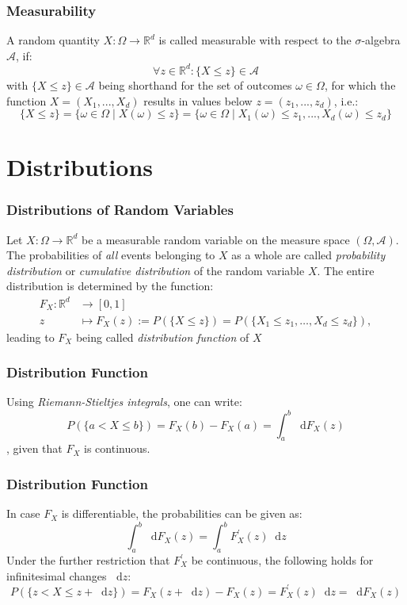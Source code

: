 \documentclass{beamer}
\newcommand*\diff{\mathop{}\!\mathrm{d}}
\begin{document}
\begin{frame}
\frametitle{Measurability}

A random quantity $X : \Omega \to \mathbb{R}^d $ is called measurable with respect to the $\sigma$-algebra $\mathscr{A}$, if:
\[
\forall z \in \mathbb{R}^d : \{X \leq z\} \in \mathscr{A}
\]
with $\{X \leq z\} \in \mathscr{A}$ being shorthand for the set of outcomes $\omega \in \Omega$, for which the function $X = (X_1, . . . , X_d)$ results in values below $z = (z_1, . . . , z_d)$, i.e.:
\[
\{X \leq z\} = \{\omega \in \Omega \mid X(\omega) \leq z\} = \{\omega \in \Omega \mid X_1(\omega)\leq z_1, ..., X_d(\omega)\leq z_d\}
\]

\end{frame}



\section{Distributions} 


\begin{frame}
\frametitle{Distributions of Random Variables}

Let $X: \Omega \to \mathbb{R}^d$ be a measurable random variable on the measure space $(\Omega, \mathscr{A})$. The probabilities of \textit{all} events belonging to $X$ as a whole are called \textit{probability distribution} or \textit{cumulative distribution} of the random variable $X$. The entire distribution is determined by the function:
\begin{align}
F_X: \mathbb{R}^d &\to \left[ 0, 1\right] \\
z &\mapsto F_X(z):= P(\{X \leq z\}) = P(\{X_1 \leq z_1, \dots , X_d \leq z_d\}),
\end{align}
leading to $F_X$ being called \textit{distribution function} of $X$

\end{frame}


\begin{frame}
\frametitle{Distribution Function}

Using \textit{Riemann-Stieltjes integrals}, one can write:
\[
P(\{ a < X \leq b\}) = F_X(b) - F_X(a) = \int_a^b \diff F_X(z)
\]
, given that $F_X$ is continuous. 

\end{frame}


\begin{frame}
\frametitle{Distribution Function}

In case $F_X$ is differentiable, the probabilities can be given as:
\[
\int_a^b \diff F_X(z) = \int_a^b F^{\prime}_X(z)\diff z
\]
Under the further restriction that $F_X^{\prime}$ be continuous, the following holds for infinitesimal changes $\diff z$:
\[
P(\{ z < X \leq z + \diff z\} ) = F_X(z + \diff z) - F_X(z) = F^{\prime}_X(z)\diff z = \diff F_X(z)
\]

\end{frame}
\end{document}
